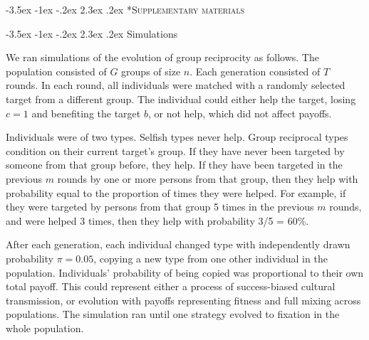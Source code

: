 \documentclass[12pt,a4paper]{article}\usepackage[]{graphicx}\usepackage[]{color}
\makeatletter
\renewcommand\section{\@startsection {section}{1}{\z@}%
{-3.5ex \@plus -1ex \@minus -.2ex}%
{2.3ex \@plus.2ex}%
{\bf\sffamily\Large}}
\makeatother
\begin{document}


\newpage
\printbibliography
%
%

\newpage

\section*{\textsc{Supplementary materials}}

\setcounter{figure}{0}
\setcounter{section}{0}
\renewcommand\thesection{Appendix~\Alph{section}:}
\renewcommand\thefigure{\Alph{section}.\arabic{figure}}  

\section{Simulations}

We ran simulations of the evolution of group reciprocity as follows. The population consisted of $G$ groups of size $n$.
Each generation consisted of $T$ rounds. In each round, all individuals were matched with a randomly selected target 
from a different group. The individual could either help the target, losing $c = 1$ and benefiting the target $b$, or not 
help, which did not affect payoffs. 

Individuals were of two types. Selfish types never help. Group reciprocal types condition on their current target's group.
If they have never been targeted by someone from that group before, they help. If they have been targeted in the
previous $m$ rounds by one or more persons from that group, then they help with probability equal to the proportion of
times they were helped. For example, if they were targeted by persons from that group 5 times in the previous $m$ rounds,
and were helped 3 times, then they help with probability 3/5 = 60\%.

After each generation, each individual changed type with independently drawn probability $\pi = 0.05$, copying a 
new type from one other individual in the population. Individuals' probability of being copied was proportional 
to their own total payoff. This could represent either a process of success-biased cultural transmission, or evolution
with payoffs representing fitness and full mixing across populations. The simulation ran until one strategy evolved 
to fixation in the whole population.
\end{document}
